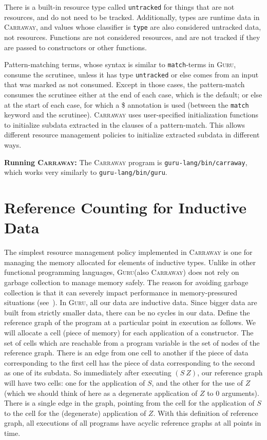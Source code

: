 \documentclass{book}[12pt]
\newcommand{\guru}[0]{\textsc{Guru}\xspace}
\newcommand{\carraway}[0]{\textsc{Carraway}\xspace}
\begin{document}
There is a built-in resource type called \texttt{untracked} for things
that are not resources, and do not need to be tracked.  Additionally,
types are runtime data in \carraway, and values whose classifier is
\texttt{type} are also considered untracked data, not resources.
Functions are not considered resources, and are not tracked if they
are passed to constructors or other functions.

Pattern-matching terms, whose syntax is similar to
\texttt{match}-terms in \guru, consume the scrutinee, unless it has
type \texttt{untracked} or else comes from an input that was marked as
not consumed.  Except in those cases, the pattern-match consumes the
scrutinee either at the end of each case, which is the default; or
else at the start of each case, for which a \$ annotation is used
(between the \texttt{match} keyword and the scrutinee).  \carraway
uses user-specified initialization functions to initialize subdata
extracted in the clauses of a pattern-match.  This allows different
resource management policies to initialize extracted subdata in
different ways.

\textbf{Running \carraway:} The \carraway program is
\texttt{guru-lang/bin/carraway}, which works very similarly to
\texttt{guru-lang/bin/guru}.

\section{Reference Counting for Inductive Data}

The simplest resource management policy implemented in \carraway is
one for managing the memory allocated for elements of inductive types.
Unlike in other functional programming languages, \guru (also
\carraway) does not rely on garbage collection to manage memory
safely.  The reason for avoiding garbage collection is that it can
severely impact performance in memory-pressured situations
(see~\cite{xian08,hertz+05}).  In \guru, all our data are inductive
data.  Since bigger data are built from strictly smaller data, there
can be no cycles in our data.  Define the reference graph of the
program at a particular point in execution as follows.  We will
allocate a cell (piece of memory) for each application of a
constructor.  The set of cells which are reachable from a program
variable is the set of nodes of the reference graph.  There is an edge
from one cell to another if the piece of data corresponding to the
first cell has the piece of data corresponding to the second as one of
its subdata.  So immediately after executing $(S\ Z)$, our reference
graph will have two cells: one for the application of $S$, and the
other for the use of $Z$ (which we should think of here as a
degenerate application of $Z$ to $0$ arguments).  There is a single
edge in the graph, pointing from the cell for the application of $S$
to the cell for the (degenerate) application of $Z$.  With this
definition of reference graph, all executions of all programs have
acyclic reference graphs at all points in time.
\end{document}
